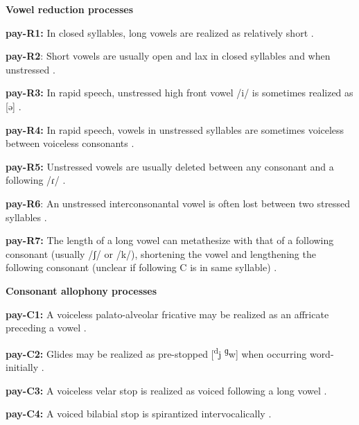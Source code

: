 \textbf{Vowel reduction processes}



\textbf{pay-R1:} In closed syllables, long vowels are realized as relatively short \citep[18]{Holt1999}.



\textbf{pay-R2}: Short vowels are usually open and lax in closed syllables and when unstressed \citep[18]{Holt1999}.



\textbf{pay-R3:} In rapid speech, unstressed high front vowel /i/ is sometimes realized as [ə] \citep[18]{Holt1999}.



\textbf{pay-R4:} In rapid speech, vowels in unstressed syllables are sometimes voiceless between voiceless consonants \citep[18]{Holt1999}.



\textbf{pay-R5:} Unstressed vowels are usually deleted between any consonant and a following /ɾ/ \citep[23]{Holt1999}.



\textbf{pay-R6}: An unstressed interconsonantal vowel is often lost between two stressed syllables \citep[23]{Holt1999}.



\textbf{pay-R7:} The length of a long vowel can metathesize with that of a following consonant (usually /ʃ/ or /k/), shortening the vowel and lengthening the following consonant (unclear if following C is in same syllable) \citep[24-5]{Holt1999}.



\textbf{Consonant allophony processes}



\textbf{pay-C1:} A voiceless palato-alveolar fricative may be realized as an affricate preceding a vowel \citep[16]{Holt1999}.



\textbf{pay-C2:} Glides may be realized as pre-stopped [\textsuperscript{d}j \textsuperscript{ɡ}w] when occurring word-initially \citep[16]{Holt1999}.



\textbf{pay-C3:} A voiceless velar stop is realized as voiced following a long vowel \citep[15-16]{Holt1999}.



\textbf{pay-C4:} A voiced bilabial stop is spirantized intervocalically \citep[16]{Holt1999}.



